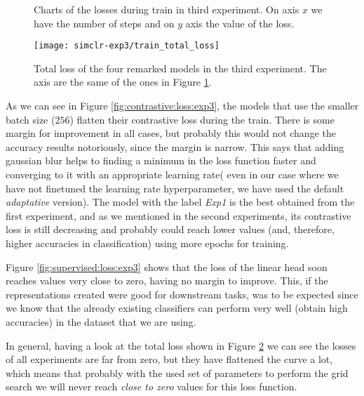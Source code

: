 \begin{figure}[htp] 
    \centering
    \hfill%
        \caption{Charts of the losses during train in third experiment. On axis $x$ we have the number of steps and on $y$ axis the value of the loss.}
        \label{fig:exp3:both:losses}
\end{figure}

\begin{figure}[H]
    \centering
    \texttt{[image: simclr-exp3/train\_total\_loss]}%
    \caption{Total loss of the four remarked models in the third experiment. The axis are the same of the ones in Figure \ref{fig:exp3:both:losses}. }
    \label{fig:total:loss:exp3}%
    \end{figure}

As we can see in Figure \ref{fig:contrastive:loss:exp3}, the models that use the smaller batch size ($256$) flatten their contrastive loss during the train. There is some margin for improvement in all cases, but probably this would not change the accuracy results notoriously, since the margin is narrow. This says that adding gaussian blur helps to finding a minimum in the loss function faster and converging to it with an appropriate learning rate( even in our case where we have not finetuned the learning rate hyperparameter, we have used the default \emph{adaptative} version). The model with the label \emph{Exp1} is the best obtained from the first experiment, and as we mentioned in the second experiments, its contrastive loss is still decreasing and probably could reach lower values (and, therefore, higher accuracies in classification) using more epochs for training.

Figure \ref{fig:supervised:loss:exp3} shows that the loss of the linear head soon reaches values very close to zero, having no margin to improve. This, if the representations created were good for downstream tasks, was to be expected since we know that the already existing  classifiers can perform very well (obtain high accuracies) in the dataset that we are using.

In general, having a look at the total loss shown in Figure \ref{fig:total:loss:exp3} we can see the losses of all experiments are far from zero, but they have flattened the curve a lot, which means that probably with the used set of parameters to perform the grid search we will never reach \emph{close to zero} values for this loss function.

